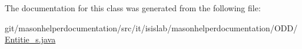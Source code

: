 The documentation for this class was generated from the following file\-:\begin{DoxyCompactItemize}
\item 
git/masonhelperdocumentation/src/it/isislab/masonhelperdocumentation/\-O\-D\-D/\hyperlink{_entitie__s_8java}{Entitie\-\_\-s.\-java}\end{DoxyCompactItemize}
